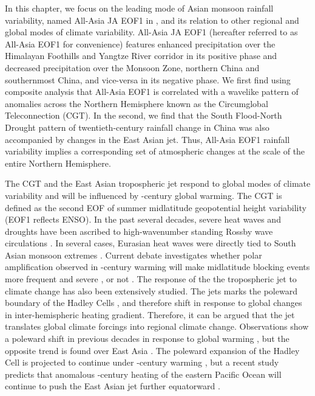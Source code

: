	In this chapter, we focus on the leading mode of Asian monsoon rainfall variability, named All-Asia JA EOF1 in \citet{Day2015}, and its relation to other regional and global modes of climate variability. All-Asia JA EOF1 (hereafter referred to as All-Asia EOF1 for convenience) features enhanced precipitation over the Himalayan Foothills and Yangtze River corridor in its positive phase and decreased precipitation over the Monsoon Zone, northern China and southernmost China, and vice-versa in its negative phase. We first find using composite analysis that All-Asia EOF1 is correlated with a wavelike pattern of anomalies across the Northern Hemisphere known as the Circumglobal Teleconnection (CGT). In the second, we find that the South Flood-North Drought pattern of twentieth-century rainfall change in China was also accompanied by changes in the East Asian jet. Thus, All-Asia EOF1 rainfall variability implies a corresponding set of atmospheric changes at the scale of the entire Northern Hemisphere.
	
	The CGT and the East Asian tropospheric jet respond to global modes of climate variability and will be influenced by -century global warming. The CGT is defined as the second EOF of summer midlatitude geopotential height variability (EOF1 reflects ENSO). In the past several decades, severe heat waves and droughts have been ascribed to high-wavenumber standing Rossby wave circulations \citep{Schubert2011}. In several cases, Eurasian heat waves were directly tied to South Asian monsoon extremes \citep{Lau2012,Trenberth2012}. Current debate investigates whether polar amplification observed in -century warming will make midlatitude blocking events more frequent and severe \citep{Francis2012}, or not \citep{Barnes2013,Hassanzadeh2014a}. The response of the the tropospheric jet to climate change has also been extensively studied. The jets marks the poleward boundary of the Hadley Cells \citep{Bordoni2008}, and therefore shift in response to global changes in inter-hemispheric heating gradient\citep{Chiang2012}. Therefore, it can be argued that the jet translates global climate forcings into regional climate change. Observations show a poleward shift in previous decades in response to global warming \citep{Fu2006,Archer2008,Fu2011}, but the opposite trend is found over East Asia \citep{Yu2007, Archer2008,Park2014a}. The poleward expansion of the Hadley Cell is projected to continue under -century warming \citep{Frierson2007,Lu2007,Kang2012}, but a recent study predicts that anomalous -century heating of the eastern Pacific Ocean will continue to push the East Asian jet further equatorward \citep{Park2014}.
	
